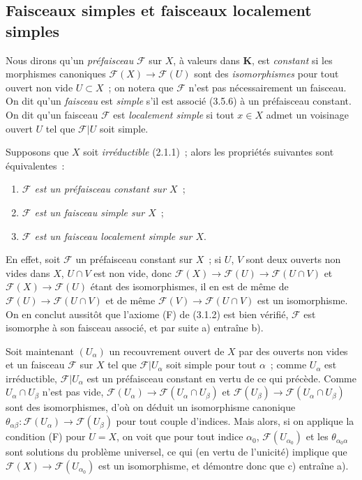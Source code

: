 \subsection{Faisceaux simples et faisceaux localement simples}

\begin{env}[3.6.1]
\label{0.3.6.1-fr}
Nous dirons qu'un \emph{préfaisceau} $\mathcal{F}$ sur $X$, à valeurs dans
$\mathbf{K}$, est \emph{constant} si les morphismes canoniques
$\mathcal{F}(X)\to\mathcal{F}(U)$ sont des \emph{isomorphismes} pour tout
ouvert non vide $U\subset X$~; on notera que $\mathcal{F}$ n'est pas
nécessairement un faisceau. On dit qu'un \emph{faisceau} est \emph{simple}
s'il est associé (3.5.6) à un préfaisceau constant. On dit qu'un faisceau
$\mathcal{F}$ est \emph{localement simple} si tout $x\in X$ admet un voisinage
ouvert $U$ tel que $\mathcal{F}|U$ soit simple.
\end{env}

\begin{env}[3.6.2]
\label{0.3.6.2-fr}
Supposons que $X$ soit \emph{irréductible} (2.1.1)~; alors les propriétés
suivantes sont équivalentes~:
\begin{enumerate}
  \item[a)] \emph{$\mathcal{F}$ est un préfaisceau constant sur $X$}~;
  \item[b)] \emph{$\mathcal{F}$ est un faisceau simple sur $X$}~;
  \item[c)] \emph{$\mathcal{F}$ est un faisceau localement simple sur $X$}.
\end{enumerate}

En effet, soit $\mathcal{F}$ un préfaisceau constant sur $X$~; si $U$, $V$
sont deux ouverts non vides dans $X$, $U\cap V$ est non vide, donc
$\mathcal{F}(X)\to\mathcal{F}(U)\to\mathcal{F}(U\cap V)$ et
$\mathcal{F}(X)\to\mathcal{F}(U)$ étant des isomorphismes, il en est de même
de $\mathcal{F}(U)\to\mathcal{F}(U\cap V)$ et de même
$\mathcal{F}(V)\to\mathcal{F}(U\cap V)$ est un isomorphisme. On en conclut
aussitôt que l'axiome (F) de (3.1.2) est bien vérifié, $\mathcal{F}$ est
isomorphe à son faisceau associé, et par suite a) entraîne b).

Soit maintenant $(U_\alpha)$ un recouvrement ouvert de $X$ par des ouverts
non vides et un faisceau $\mathcal{F}$ sur $X$ tel que
$\mathcal{F}|U_\alpha$ soit simple pour tout $\alpha$~; comme $U_\alpha$ est
irréductible, $\mathcal{F}|U_\alpha$ est un préfaisceau constant en vertu de
ce qui précède. Comme $U_\alpha\cap U_\beta$ n'est pas vide,
$\mathcal{F}(U_\alpha)\to\mathcal{F}(U_\alpha\cap U_\beta)$ et
$\mathcal{F}(U_\beta)\to\mathcal{F}(U_\alpha\cap U_\beta)$ sont des
isomorphismes, d'où on déduit un isomorphisme canonique
$\theta_{\alpha\beta}:\mathcal{F}(U_\alpha)\to\mathcal{F}(U_\beta)$ pour tout
couple d'indices. Mais alors, si on applique la condition (F) pour $U=X$, on
voit que pour tout indice $\alpha_0$, $\mathcal{F}(U_{\alpha_0})$ et les
$\theta_{\alpha_0\alpha}$ sont solutions du problème universel, ce qui (en
vertu de l'unicité) implique que
$\mathcal{F}(X)\to\mathcal{F}(U_{\alpha_0})$ est un isomorphisme, et démontre
donc que c) entraîne a).
\end{env}

